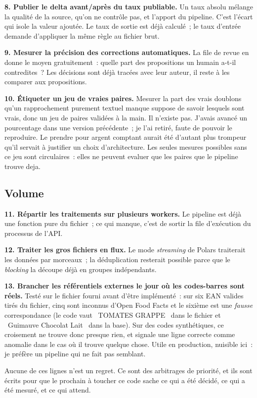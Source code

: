 \documentclass[11pt,a4paper]{article}
\newcommand{\gui}[1]{\guillemotleft{}~#1~\guillemotright{}}
\begin{document}
\textbf{8. Publier le delta avant/après du taux publiable.} Un taux absolu mélange la qualité de
la source, qu'on ne contrôle pas, et l'apport du pipeline. C'est l'écart qui isole la valeur
ajoutée. Le taux de sortie est déjà calculé~; le taux d'entrée demande d'appliquer la même règle au
fichier brut.

\textbf{9. Mesurer la précision des corrections automatiques.} La file de revue en donne le moyen
gratuitement~: quelle part des propositions un humain a-t-il contredites~? Les décisions sont déjà
tracées avec leur auteur, il reste à les comparer aux propositions.

\textbf{10. Étiqueter un jeu de vraies paires.} Mesurer la part des vrais doublons qu'un
rapprochement purement textuel manque suppose de savoir lesquels sont vrais, donc un jeu de paires
validées à la main. Il n'existe pas. J'avais avancé un pourcentage dans une version précédente~;
je l'ai retiré, faute de pouvoir le reproduire. Le prendre pour argent comptant aurait été
d'autant plus trompeur qu'il servait à justifier un choix d'architecture. Les seules mesures
possibles sans ce jeu sont circulaires~: elles ne peuvent evaluer que les paires que le pipeline
trouve deja.

\subsection{Volume}

\textbf{11. Répartir les traitements sur plusieurs workers.} Le pipeline est déjà une fonction pure
du fichier~; ce qui manque, c'est de sortir la file d'exécution du processus de l'API.

\textbf{12. Traiter les gros fichiers en flux.} Le mode \emph{streaming} de Polars traiterait les
données par morceaux~; la déduplication resterait possible parce que le \emph{blocking} la découpe
déjà en groupes indépendants.

\textbf{13. Brancher les référentiels externes le jour où les codes-barres sont réels.} Testé sur
le fichier fourni avant d'être implémenté~: sur six EAN valides tirés du fichier, cinq sont
inconnus d'Open Food Facts et le sixième est une \emph{fausse} correspondance (le code vaut
\gui{TOMATES GRAPPE} dans le fichier et \gui{Guimauve Chocolat Lait} dans la base). Sur des codes
synthétiques, ce croisement ne trouve donc presque rien, et signale une ligne correcte comme
anomalie dans le cas où il trouve quelque chose. Utile en production, nuisible ici~: je préfère un pipeline qui ne fait pas semblant.

\vspace{6pt}
{\color{soft}\small Aucune de ces lignes n'est un regret. Ce sont des arbitrages de priorité, et
ils sont écrits pour que le prochain à toucher ce code sache ce qui a été décidé, ce qui a été
mesuré, et ce qui attend.}
\end{document}
